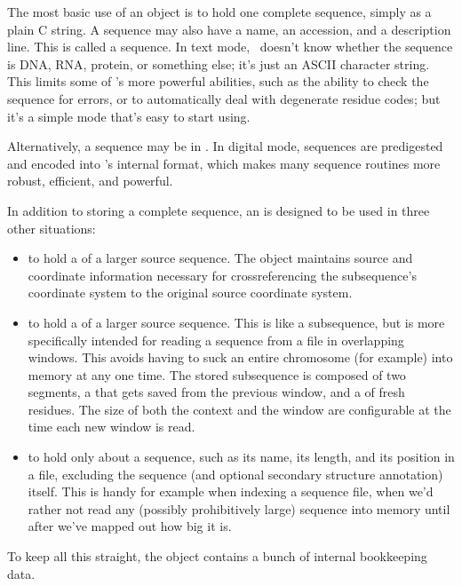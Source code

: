 The most basic use of an  object is to hold one
complete sequence, simply as a plain C string. A sequence may also
have a name, an accession, and a description line.  This is called a
 sequence. In text mode, \Easel\ doesn't know
whether the sequence is DNA, RNA, protein, or something else; it's
just an ASCII character string. This limits some of \Easel's more
powerful abilities, such as the ability to check the sequence for
errors, or to automatically deal with degenerate residue codes; but
it's a simple mode that's easy to start using.

Alternatively, a sequence may be in . In digital
mode, sequences are predigested and encoded into \Easel's internal
format, which makes many sequence routines more robust, efficient, and
powerful.

In addition to storing a complete sequence, an  is
designed to be used in three other situations:

\begin{itemize}
\item to hold a  of a larger source sequence. The
  object maintains source and coordinate information necessary for
  crossreferencing the subsequence's coordinate system to the original
  source coordinate system.

\item to hold a  of a larger source sequence. This is
  like a subsequence, but is more specifically intended for reading a
  sequence from a file in overlapping windows. This avoids having to
  suck an entire chromosome (for example) into memory at any one
  time. The stored subsequence is composed of two segments, a
   that gets saved from the previous window,
  and a  of fresh residues. The size of both the
  context and the window are configurable at the time each new window
  is read.

\item to hold only  about a sequence, such as its
  name, its length, and its position in a file, excluding the sequence
  (and optional secondary structure annotation) itself. This is handy
  for example when indexing a sequence file, when we'd rather not read
  any (possibly prohibitively large) sequence into memory until after
  we've mapped out how big it is.
\end{itemize}

To keep all this straight, the object contains a bunch of internal
bookkeeping data.

